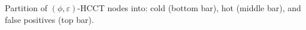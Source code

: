 \label{fig:hcct-breakdown} Partition of $(\phi,\varepsilon)$-HCCT nodes into: cold (bottom bar), hot (middle bar), and false positives (top bar).